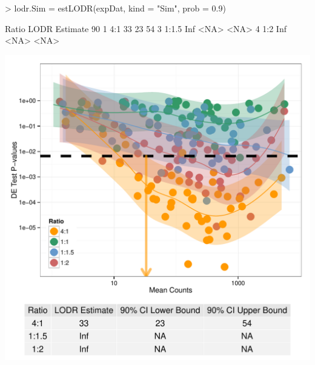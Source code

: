 \documentclass{article}
\begin{document}
\begin{center}
\begin{Schunk}
\begin{Sinput}
> lodr.Sim = estLODR(expDat, kind = "Sim", prob = 0.9)  
\end{Sinput}
\begin{Soutput}
  Ratio LODR Estimate 90%
1   4:1            33                 23                 54
3 1:1.5           Inf               <NA>               <NA>
4   1:2           Inf               <NA>               <NA>
\end{Soutput}
\end{Schunk}
\includegraphics{erccdashboardVignette-estLODRSim}
\end{center}
\end{document}
